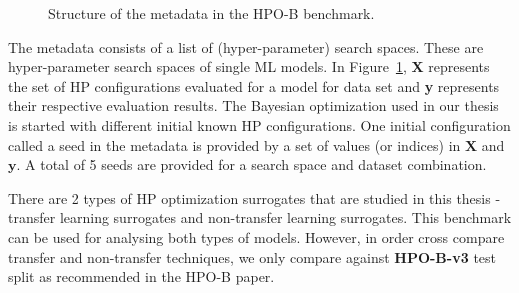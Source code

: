 \documentclass[12pt, twoside, ngerman]{report}
\begin{document}
\begin{figure}[htb]
\centering
{}
\caption{Structure of the metadata in the HPO-B benchmark.}
\label{fig:metadataorganization}
\end{figure}

The metadata consists of a list of (hyper-parameter) search spaces.
These are hyper-parameter search spaces of single ML models.
In Figure~\ref{fig:metadataorganization}, \textbf{X} represents the set of HP configurations evaluated for a model for data set and
\textbf{y} represents their respective evaluation results.
The Bayesian optimization used in our thesis is started with different initial known HP configurations.
One initial configuration called a seed in the metadata is provided by a set of values (or indices) in $\textbf{X}$ and $\textbf{y}$.
A total of 5 seeds are provided for a search space and dataset combination.

There are 2 types of HP optimization surrogates that are studied in this thesis - transfer learning surrogates
and non-transfer learning surrogates.
This benchmark can be used for analysing both types of models.
However,  in order cross compare transfer and non-transfer techniques,  we only compare against \textbf{HPO-B-v3} test split as recommended in the HPO-B paper.
\end{document}
